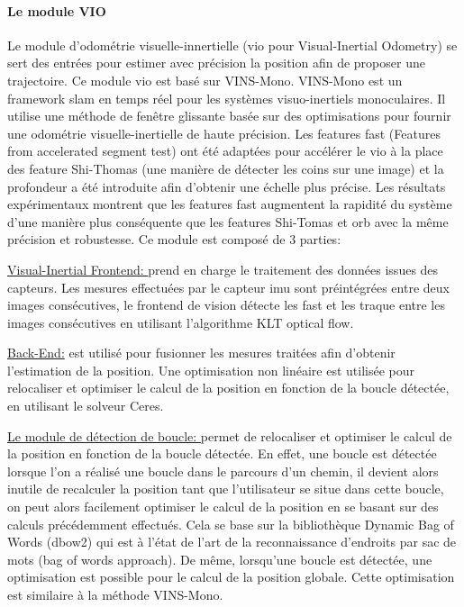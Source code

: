 \documentclass[11pt]{article}
\begin{document}
          \paragraph{Le module VIO}
            Le module d'odométrie visuelle-innertielle (\acrshort{vio} pour Visual-Inertial Odometry) se sert des entrées pour estimer avec précision la position 
            afin de proposer une trajectoire. Ce module \acrshort{vio} est basé sur VINS-Mono. VINS-Mono est un framework \acrshort{slam} en temps réel pour les 
            systèmes visuo-inertiels monoculaires. Il utilise une méthode de fenêtre glissante basée sur des optimisations pour fournir une odométrie 
            visuelle-inertielle de haute précision.
            Les features \acrshort{fast} (Features from accelerated segment test) ont été adaptées pour accélérer le \acrshort{vio} à 
            la place des feature Shi-Thomas (une manière de détecter les coins sur une image) et la profondeur a été introduite afin d'obtenir une échelle 
            plus précise. Les résultats expérimentaux montrent que les features \acrshort{fast} augmentent la rapidité du système d'une manière plus conséquente 
            que les features Shi-Tomas et \acrshort{orb} avec la même précision et robustesse. Ce module est composé de 3 parties:

          \underline{Visual-Inertial Frontend: }
            prend en charge le traitement des données issues des capteurs. Les mesures effectuées par le capteur \acrshort{imu}
            sont préintégrées entre deux images consécutives, le frontend de vision détecte les \acrshort{fast}
            et les traque entre les images consécutives en utilisant l'algorithme KLT optical flow.

          \underline{Back-End:} est utilisé pour fusionner les mesures traitées afin d'obtenir l'estimation de la position. Une optimisation non linéaire
            est utilisée pour relocaliser et optimiser le calcul de la position en fonction de la boucle détectée, en utilisant le solveur Ceres. 

          \underline{Le module de détection de boucle: } permet de relocaliser et optimiser le calcul de la position en fonction de
            la boucle détectée. En effet, une boucle est détectée lorsque l'on a réalisé une boucle dans le parcours d'un chemin, il devient alors inutile
            de recalculer la position tant que l'utilisateur se situe dans cette boucle, on peut alors facilement optimiser le calcul de la position en se 
            basant sur des calculs précédemment effectués. Cela se base sur la bibliothèque Dynamic Bag of Words (\acrshort{dbow2}) qui est à l'état de l'art de la reconnaissance d'endroits 
            par sac de mots (bag of words approach). De même, lorsqu'une boucle est détectée, une optimisation est possible pour le calcul de la position 
            globale. Cette optimisation est similaire à la méthode VINS-Mono.
\end{document}
